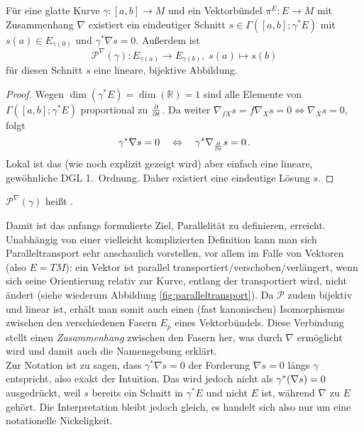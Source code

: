 \documentclass[../H_Analysis_main.tex]{subfiles}
\begin{document}
\begin{satz}
Für eine glatte Kurve $\gamma: [a, b] \rightarrow M$ und ein Vektorbündel $\pi^E: E \rightarrow M$ mit Zusammenhang $\nabla$ existiert ein eindeutiger Schnitt $s \in \Gamma([a, b]; \gamma^* E)$ mit
$s(a) \in E_{\gamma(0)}$ und $\gamma^* \nabla s = 0$. Außerdem ist
\begin{equation}
\mathcal{P}^\nabla(\gamma): E_{\gamma(a)} \rightarrow E_{\gamma(b)}, \; s(a) \mapsto s(b)
\end{equation}
für diesen Schnitt $s$ eine lineare, bijektive Abbildung.
\end{satz}

\begin{proof}
Wegen $\dim(\gamma^* E) = \dim(\mathbb{R}) = 1$ sind alle Elemente von $\Gamma([a, b]; \gamma^* E)$ proportional zu $\pdv{t}$. Da weiter $\nabla_{f X} s = f \nabla_X s = 0 \Leftrightarrow \nabla_X s = 0$, folgt
\begin{equation*}
\gamma^* \nabla s = 0 \quad \Leftrightarrow \quad \gamma^* \nabla_{\pdv{t}} s = 0 \, .
\end{equation*}
Lokal ist das (wie noch explizit gezeigt wird) aber einfach eine lineare, gewöhnliche DGL 1.~Ordnung. Daher existiert eine eindeutige Lösung $s$.
\end{proof}

\begin{defi}[Paralleltransport]
$\mathcal{P}^\nabla(\gamma)$ heißt .
\end{defi}

Damit ist das anfangs formulierte Ziel, Parallelität zu definieren, erreicht. Unabhängig von einer vielleicht komplizierten Definition kann man sich Paralleltransport sehr anschaulich vorstellen, vor allem im Falle von Vektoren (also $E = TM$): ein Vektor ist parallel transportiert/verschoben/verlängert, wenn sich seine Orientierung relativ zur Kurve, entlang der transportiert wird, nicht ändert (siehe wiederum Abbildung \ref{fig:paralleltransport}). Da $\mathcal{P}$ zudem bijektiv und linear ist, erhält man somit auch einen (fast kanonischen) Isomorphismus zwischen den verschiedenen Fasern $E_p$ eines Vektorbündels. Diese Verbindung stellt einen \emph{Zusammenhang} zwischen den Fasern her, was durch $\nabla$ ermöglicht wird und damit auch die Namensgebung erklärt.\\


Zur Notation ist zu sagen, dass $\gamma^* \nabla s = 0$ der Forderung $\nabla s = 0$ längs $\gamma$ entspricht, also exakt der Intuition. Das wird jedoch nicht als $\gamma^*\qty(\nabla s) = 0$ ausgedrückt, weil $s$ bereits ein Schnitt in $\gamma^* E$ und nicht $E$ ist, während $\nabla$ zu $E$ gehört. Die Interpretation bleibt jedoch gleich, es handelt sich also nur um eine notationelle Nickeligkeit.
\end{document}
